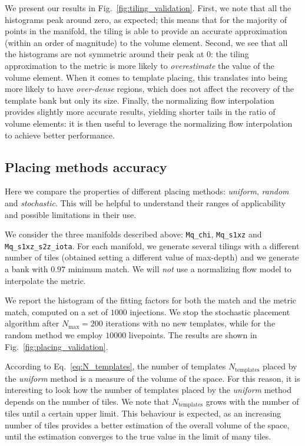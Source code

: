 \documentclass[twocolumn,showpacs,preprintnumbers,nofootinbib,prd,
superscriptaddress,10pt]{revtex4-2}
\begin{document}
We present our results in Fig.~\ref{fig:tiling_validation}.
First, we note that all the histograms peak around zero, as expected; this means that for the majority of points in the manifold, the tiling is able to provide an accurate approximation (within an order of magnitude) to the volume element.
Second, we see that all the histograms are not symmetric around their peak at $0$: the tiling approximation to the metric is more likely to {\it overestimate} the value of the volume element. When it comes to template placing, this translates into being more likely to have {\it over-dense} regions, which does not affect the recovery of the template bank but only its size.
Finally, the normalizing flow interpolation provides slightly more accurate results, yielding shorter tails in the ratio of volume elements: it is then useful to leverage the normalizing flow interpolation to achieve better performance.


\subsection{Placing methods accuracy} \label{sec:placing_accuracy}

Here we compare the properties of different placing methods: \textit{uniform}, \textit{random} and \textit{stochastic}.
This will be helpful to understand their ranges of applicability and possible limitations in their use.

We consider the three manifolds described above: \texttt{Mq\_chi}, \texttt{Mq\_s1xz} and \texttt{Mq\_s1xz\_s2z\_iota}.
For each manifold, we generate several tilings with a different number of tiles (obtained setting a different value of max-depth) and we generate a bank with $0.97$ minimum match.
We will {\it not} use a normalizing flow model to interpolate the metric.

We report the histogram of the fitting factors for both the match and the metric match, computed on a set of $1000$ injections.
We stop the stochastic placement algorithm after $N_\text{max} = 200$ iterations with no new templates, while for the random method we employ $10000$ livepoints.
The results are shown in Fig.~\ref{fig:placing_validation}.

According to Eq.~\eqref{eq:N_templates}, the number of templates $N_{\text{templates}}$ placed by the {\it uniform} method is a measure of the volume of the space. For this reason, it is interesting to look how the number of templates placed by the {\it uniform} method depends on the number of tiles.
We note that $N_{\text{templates}}$ grows with the number of tiles until a certain upper limit. This behaviour is expected, as an increasing number of tiles provides a better estimation of the overall volume of the space, until the estimation converges to the true value in the limit of many tiles. 
\end{document}
